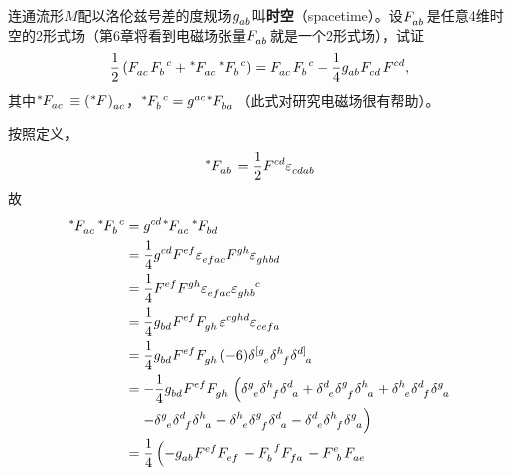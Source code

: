\begin{xiti}
	\item 连通流形$M$配以洛伦兹号差的度规场$\tensor{g}{_a_b} $叫\textbf{时空}（spacetime）。设$\tensor{F}{_a_b} $是任意4维时空的2形式场（第6章将看到电磁场张量$\tensor{F}{_a_b} $就是一个2形式场），试证
	\[ \frac{1}{2} \left( \tensor{F}{_a_c}\tensor{F}{_b^c} + \tensor[^*]{F}{_a_c} \tensor[^*]{F}{_b^c} \right) = \tensor{F}{_a_c} \tensor{F}{_b^c} - \frac{1}{4} \tensor{g}{_a_b} \tensor{F}{_c_d} \tensor{F}{^c^d}, \]
	其中$\tensor[^*]{F}{_a_c} \equiv \tensor{\left(\tensor[^*]{F}{}\right)}{_a_c} $，$\tensor[^*]{F}{_b^c}= \tensor{g}{^a^c} \tensor[^*]{F}{_b_a} $（此式对研究电磁场很有帮助）。
	
	\begin{zm}
		按照定义，
		\begin{displaymath}
		\tensor[^*]{F}{_a_b} = \frac{1}{2} \tensor{F}{^c^d} \tensor{\varepsilon}{_c_d_a_b}
		\end{displaymath}
		故
		\begin{align*}
		\tensor[^*]{F}{_a_c} \tensor[^*]{F}{_b^c} =& \; \tensor{g}{^c^d} \tensor[^*]{F}{_a_c} \tensor[^*]{F}{_b_d} \\
		=& \mspace{5mu} \frac{1}{4} \tensor{g}{^c^d} \tensor{F}{^e^f} \tensor{\varepsilon}{_e_f_a_c} \tensor{F}{^g^h} \tensor{\varepsilon}{_g_h_b_d}\\
		=& \mspace{5mu} \frac{1}{4} \tensor{F}{^e^f} \tensor{F}{^g^h} \tensor{\varepsilon}{_e_f_a_c}  \tensor{\varepsilon}{_g_h_b^c}\\
		=& \mspace{5mu} \frac{1}{4} \tensor{g}{_b_d} \tensor{F}{^e^f} \tensor{F}{_g_h} \tensor{\varepsilon}{^c^g^h^d} \tensor{\varepsilon}{_c_e_f_a}\\
		=& \mspace{5mu} \frac{1}{4} \tensor{g}{_b_d} \tensor{F}{^e^f} \tensor{F}{_g_h} (-6) \tensor{\delta}{^{[g}_e} \tensor{\delta}{^h_f} \tensor{\delta}{^{d]}_a}\\
		=& \mspace{1mu} - \mspace{-4mu} \frac{1}{4} \tensor{g}{_b_d} \tensor{F}{^e^f} \tensor{F}{_g_h} \left( \tensor{\delta}{^g_e} \tensor{\delta}{^h_f} \tensor{\delta}{^d_a} + \tensor{\delta}{^d_e} \tensor{\delta}{^g_f} \tensor{\delta}{^h_a} + \tensor{\delta}{^h_e} \tensor{\delta}{^d_f} \tensor{\delta}{^g_a}\right.\\
		& \left.- \tensor{\delta}{^g_e} \tensor{\delta}{^d_f} \tensor{\delta}{^h_a} - \tensor{\delta}{^h_e} \tensor{\delta}{^g_f} \tensor{\delta}{^d_a} - \tensor{\delta}{^d_e} \tensor{\delta}{^h_f} \tensor{\delta}{^g_a} \right)\\
		=& \mspace{5mu} \frac{1}{4} \left( - \tensor{g}{_a_b} \tensor{F}{^e^f} \tensor{F}{_e_f} - \tensor{F}{_b^f} \tensor{F}{_f_a} - \tensor{F}{^e_b} \tensor{F}{_a_e} \right. \\

\end{align*}
\end{zm}
\end{xiti}
